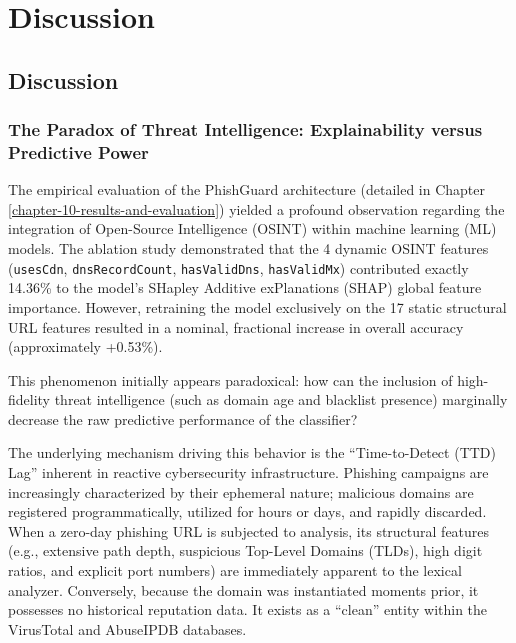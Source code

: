 \chapter{Discussion}
\label{chapter-11-discussion}

\section{Discussion}

\subsection{The Paradox of Threat Intelligence: Explainability versus
Predictive
Power}\label{the-paradox-of-threat-intelligence-explainability-versus-predictive-power}

The empirical evaluation of the PhishGuard architecture (detailed in
Chapter \ref{chapter-10-results-and-evaluation}) yielded a profound observation regarding the integration of
Open-Source Intelligence (OSINT) within machine learning (ML) models.
The ablation study demonstrated that the 4 dynamic OSINT features
(\texttt{usesCdn}, \texttt{dnsRecordCount}, \texttt{hasValidDns},
\texttt{hasValidMx}) contributed exactly 14.36\% to the model's SHapley
Additive exPlanations (SHAP) global feature importance. However,
retraining the model exclusively on the 17 static structural URL
features resulted in a nominal, fractional increase in overall accuracy
(approximately +0.53\%).

This phenomenon initially appears paradoxical: how can the inclusion of
high-fidelity threat intelligence (such as domain age and blacklist
presence) marginally decrease the raw predictive performance of the
classifier?

The underlying mechanism driving this behavior is the ``Time-to-Detect
(TTD) Lag'' inherent in reactive cybersecurity infrastructure. Phishing
campaigns are increasingly characterized by their ephemeral nature;
malicious domains are registered programmatically, utilized for hours or
days, and rapidly discarded. When a zero-day phishing URL is subjected
to analysis, its structural features (e.g., extensive path depth,
suspicious Top-Level Domains (TLDs), high digit ratios, and explicit
port numbers) are immediately apparent to the lexical analyzer.
Conversely, because the domain was instantiated moments prior, it
possesses no historical reputation data. It exists as a ``clean'' entity
within the VirusTotal and AbuseIPDB databases.

